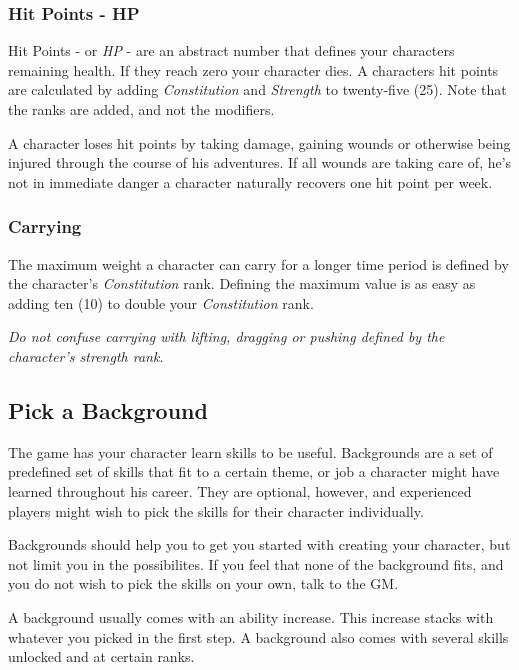 \subsubsection{Hit Points - HP}

Hit Points - or \emph{HP} - are an abstract number that defines your characters
remaining health. If they reach zero your character dies. A characters hit
points are calculated by adding \emph{Constitution} and \emph{Strength} to
twenty-five (25). Note that the ranks are added, and not the modifiers.

A character loses hit points by taking damage, gaining wounds or otherwise being
injured through the course of his adventures. If all wounds are taking care of,
he's not in immediate danger a character naturally recovers one hit point per
week.

\subsubsection{Carrying}
\label{subs:Carrying}

The maximum weight a character can carry for a longer time period is defined by the character's \emph{Constitution} rank. Defining the maximum value is as easy as adding ten (10) to double your \emph{Constitution} rank.

\emph{Do not confuse carrying with lifting, dragging or pushing defined by the character's strength rank.}

\subsection{Pick a Background}

The game has your character learn skills to be useful. Backgrounds are a set of
predefined set of skills that fit to a certain theme, or job a character might
have learned throughout his career. They are optional, however, and experienced
players might wish to pick the skills for their character individually.

Backgrounds should help you to get you started with creating your character, but
not limit you in the possibilites. If you feel that none of the background fits,
and you do not wish to pick the skills on your own, talk to the GM.

A background usually comes with an ability increase. This increase stacks with
whatever you picked in the first step. A background also comes with several
skills unlocked and at certain ranks.


